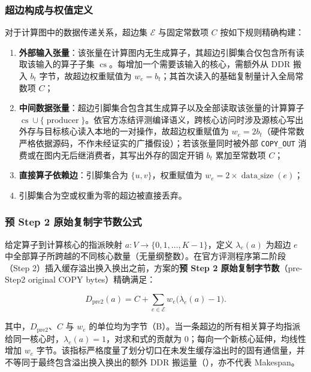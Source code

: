\documentclass[anonymous,notoc]{gmcm2026}
\providecommand{\tightlist}{\setlength{\itemsep}{0pt}\setlength{\parskip}{0pt}}
\begin{document}
\subsubsection{超边构成与权值定义}

对于计算图中的数据传递关系，超边集 \(\mathcal{E}\) 与固定常数项 \(C\) 按如下规则精确构建：

\begin{enumerate}
\def\labelenumi{\arabic{enumi}.}
\tightlist
\item
  \textbf{外部输入张量}：该张量在计算图内无生成算子，其超边引脚集合仅包含所有读取该输入的算子子集 \(\operatorname{cs}\)。每增加一个需要该输入的核心，需额外从 DDR 搬入 \(b_t\) 字节，故超边权重赋值为 \(w_e = b_t\)；其首次读入的基础复制量计入全局常数项 \(C\)；
\item
  \textbf{中间数据张量}：超边引脚集合包含其生成算子以及全部读取该张量的计算算子 \(\operatorname{cs} \cup \{\operatorname{producer}\}\)。依官方冻结评测编译语义，跨核心访问时涉及源核心写出外存与目标核心读入本地的一对操作，故超边权重赋值为 \(w_e = 2b_t\)（硬件常数严格依据源码，不作未经证实的广播假设）；若该张量同时被外部 \texttt{COPY\_OUT} 消费或在图内无后继消费者，其写出外存的固定开销 \(b_t\) 累加至常数项 \(C\)；
\item
  \textbf{直接算子依赖边}：引脚集合为 \(\{u, v\}\)，权重赋值为 \(w_e = 2 \times \operatorname{data\_size}(e)\)；
\item
  引脚集合为空或权重为零的超边被直接丢弃。
\end{enumerate}

\subsubsection{预 Step 2 原始复制字节数公式}

给定算子到计算核心的指派映射 \(a: V \to \{0, 1, \dots, K-1\}\)，定义 \(\lambda_e(a)\) 为超边 \(e\) 中全部算子所跨越的不同核心数量（无量纲整数）。在官方评测程序第二阶段（Step 2）插入缓存溢出换入换出之前，方案的\textbf{预 Step 2 原始复制字节数}（pre-Step2 original COPY bytes）精确满足：

\begin{equation}
D_{\mathrm{pre2}}(a) = C + \sum_{e \in \mathcal{E}} w_e \bigl(\lambda_e(a) - 1\bigr).
\end{equation}

其中，\(D_{\mathrm{pre2}}\)、\(C\) 与 \(w_e\) 的单位均为字节（B）。当一条超边的所有相关算子均指派给同一核心时，\(\lambda_e(a) = 1\)，对求和式的贡献为 0；每向一个新核心延伸，均线性增加 \(w_e\) 字节。该指标严格度量了划分切口在未发生缓存溢出时的固有通信量，并不等同于最终包含溢出换入换出的额外 DDR 搬运量（\texttt{}），亦不代表 Makespan。
\end{document}
